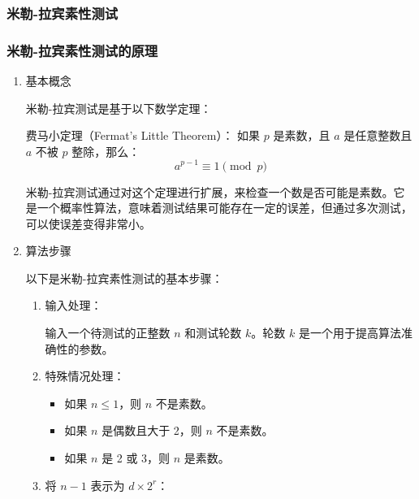 \subsubsection{米勒-拉宾素性测试}
\subsubsection*{米勒-拉宾素性测试的原理}
\begin{enumerate}
	\item 基本概念

	      米勒-拉宾测试是基于以下数学定理：

	      费马小定理（Fermat's Little Theorem）：
	      如果 \( p \) 是素数，且 \( a \) 是任意整数且 \( a \) 不被 \( p \) 整除，那么：
	      \[ a^{p-1} \equiv 1 \pmod{p} \]

	      米勒-拉宾测试通过对这个定理进行扩展，来检查一个数是否可能是素数。它是一个概率性算法，意味着测试结果可能存在一定的误差，但通过多次测试，可以使误差变得非常小。
	\item  算法步骤

	      以下是米勒-拉宾素性测试的基本步骤：

	      \begin{enumerate}
		      \item	输入处理：

		            输入一个待测试的正整数 \( n \) 和测试轮数 \( k \)。轮数 \( k \) 是一个用于提高算法准确性的参数。
		      \item	特殊情况处理：

		            \begin{itemize}
			            \item	如果 \( n \leqslant 1 \)，则 \( n \) 不是素数。
			            \item	如果 \( n \) 是偶数且大于 2，则 \( n \) 不是素数。
			            \item	如果 \( n \) 是 2 或 3，则 \( n \) 是素数。
		            \end{itemize}
		      \item	将 \( n-1 \) 表示为 \( d \times 2^r \)：


\end{enumerate}
\end{enumerate}
